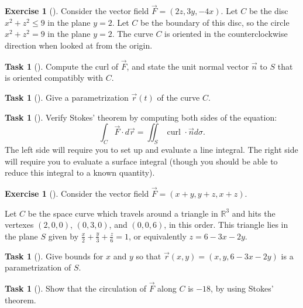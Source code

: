 \documentclass[10pt,]{book}
\theoremstyle{plain}
\theoremstyle{definition}
\theoremstyle{definition}
\theoremstyle{definition}
\theoremstyle{definition}
\newtheorem{exploration}[project]{Exercise}
\newtheorem{task}[project]{Task}
\theoremstyle{definition}
\numberwithin{equation}{section}
\newcommand{\ds}{\displaystyle}
\begin{document}
\begin{exploration}[]\label{exploration-292}
Consider the vector field \(\vec F = (2z,3y,-4x)\). Let \(C\) be the disc \(x^2+z^2\leq 9\) in the plane \(y=2\). Let \(C\) be the boundary of this disc, so the circle \(x^2+z^2=9\) in the plane \(y=2\). The curve \(C\) is oriented in the counterclockwise direction when looked at from the origin.%
\begin{task}[]\label{task-794}
Compute the curl of \(\vec F\), and state the unit normal vector \(\vec n\) to \(S\) that is oriented compatibly with \(C\).%
\end{task}
\begin{task}[]\label{task-795}
Give a parametrization \(\vec r(t)\) of the curve \(C\).%
\end{task}
\begin{task}[]\label{task-796}
Verify Stokes' theorem by computing both sides of the equation:%
\begin{equation*}
\int_C\vec F\cdot d\vec r = \iint_S \text{ curl } \cdot \vec n d\sigma.
\end{equation*}
The left side will require you to set up and evaluate a line integral.  The right side will require you to evaluate a surface integral (though you should be able to reduce this integral to a known quantity).%
\end{task}
\end{exploration}
\begin{exploration}[]\label{exploration-293}
Consider the vector field \(\vec F = \left(x+y, y+z, x+z\right)\).%
\par
Let \(C\) be the space curve which travels around a triangle in \(\mathbb{R}^3\) and hits the vertexes \((2,0,0)\), \((0,3,0)\), and \((0,0,6)\), in this order. This triangle lies in the plane \(S\) given by \(\ds \frac x2+\frac y3 +\frac z6=1\), or equivalently \(z=6-3x-2y\).%
\begin{task}[]\label{task-797}
Give bounds for \(x\) and \(y\) so that \(\vec r(x,y)=(x,y,6-3x-2y)\) is a parametrization of \(S\).%
\end{task}
\begin{task}[]\label{task-798}
Show that the circulation of \(\vec F\) along \(C\) is \(-18\), by using Stokes' theorem.%
\end{task}
\end{exploration}
\end{document}
